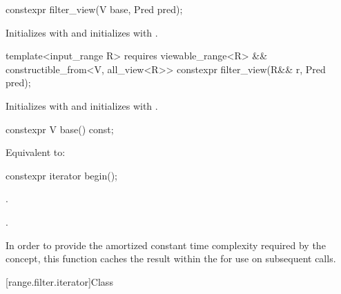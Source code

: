 \documentclass{wg21}
\begin{document}
%
\begin{itemdecl}
constexpr filter_view(V base, Pred pred);
\end{itemdecl}

\begin{itemdescr}
\pnum
\effects Initializes  with  and initializes
 with .
\end{itemdescr}

%
\begin{itemdecl}
template<input_range R>
requires viewable_range<R> && constructible_from<V, all_view<R>>
constexpr filter_view(R&& r, Pred pred);
\end{itemdecl}

\begin{itemdescr}
\pnum
\effects Initializes  with 
and initializes  with .
\end{itemdescr}

%
\begin{itemdecl}
constexpr V base() const;
\end{itemdecl}

\begin{itemdescr}
\pnum
\effects Equivalent to: 
\end{itemdescr}

%
\begin{itemdecl}
constexpr iterator begin();
\end{itemdecl}

\begin{itemdescr}
\pnum
\expects
{}.

\pnum
\returns
{}.

\pnum
\remarks In order to provide the amortized constant time complexity required by
the  concept,  this function caches the result within the
 for use on subsequent calls.
\end{itemdescr}

[range.filter.iterator]{Class }
\end{document}
